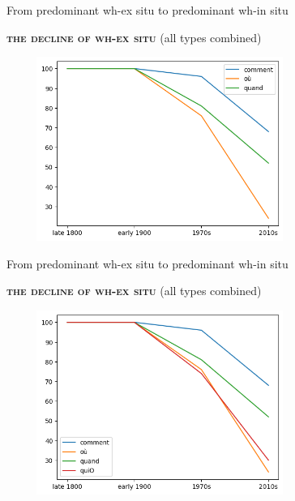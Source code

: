 \documentclass[lesson_slides]{subfiles}
\begin{document}
\begin{frame}[c]{From predominant wh-ex situ to predominant wh-in situ}

    \textbf{\textsc{the decline of wh-ex situ}} (all types combined)
    \begin{center}
        \includegraphics[width=10cm, height=6cm]{images/three.png}
    \end{center}
  
\end{frame}
\begin{frame}[c]{From predominant wh-ex situ to predominant wh-in situ}

    \textbf{\textsc{the decline of wh-ex situ}} (all types combined)
    \begin{center}
        \includegraphics[width=10cm, height=6cm]{images/four.png}
    \end{center}
  
\end{frame}
\end{document}
